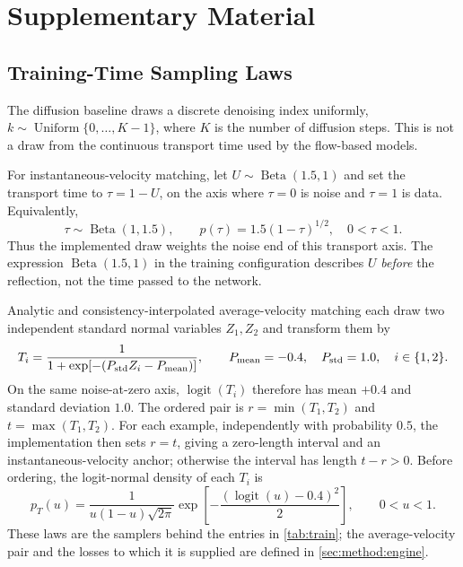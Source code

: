 \chapter{Supplementary Material}\label{app:derivations}\label{app:supplementary}

\section{Training-Time Sampling Laws}\label{app:training-time-laws}


The diffusion baseline draws a discrete denoising index uniformly,
$k\sim\operatorname{Uniform}\{0,\ldots,K-1\}$, where $K$ is the number of diffusion steps. This is not
a draw from the continuous transport time used by the flow-based models.

For instantaneous-velocity matching, let $U\sim\operatorname{Beta}(1.5,1)$ and set the transport
time to $\tau=1-U$, on the axis where $\tau=0$ is noise and $\tau=1$ is data. Equivalently,
\begin{equation}
  \tau\sim\operatorname{Beta}(1,1.5),\qquad
  p(\tau)=1.5(1-\tau)^{1/2},\quad 0<\tau<1.
\end{equation}
Thus the implemented draw weights the noise end of this transport axis. The expression
$\operatorname{Beta}(1.5,1)$ in the training configuration describes $U$ \emph{before} the reflection,
not the time passed to the network.

Analytic and consistency-interpolated average-velocity matching each draw two independent standard
normal variables $Z_1,Z_2$ and transform them by
\begin{equation}
  T_i=\frac{1}{1+\exp[-(P_{\textrm{std}}Z_i-P_{\textrm{mean}})]},\qquad
  P_{\textrm{mean}}=-0.4,\quad P_{\textrm{std}}=1.0,\quad i\in\{1,2\}.
\end{equation}
On the same noise-at-zero axis, $\operatorname{logit}(T_i)$ therefore has mean $+0.4$ and standard
deviation $1.0$. The ordered pair is $r=\min(T_1,T_2)$ and $t=\max(T_1,T_2)$. For each example,
independently with probability $0.5$, the implementation then sets $r=t$, giving a zero-length interval and an
instantaneous-velocity anchor; otherwise the interval has length $t-r>0$. Before ordering, the
logit-normal density of each $T_i$ is
\begin{equation}
  p_T(u)=\frac{1}{u(1-u)\sqrt{2\pi}}
  \exp\!\left[-\frac{(\operatorname{logit}(u)-0.4)^2}{2}\right],\qquad 0<u<1.
\end{equation}
These laws are the samplers behind the entries in \autoref{tab:train}; the average-velocity pair and
the losses to which it is supplied are defined in \autoref{sec:method:engine}.


